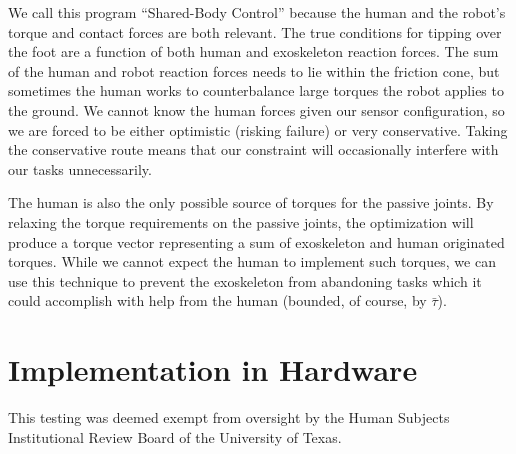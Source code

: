 

We call this program ``Shared-Body Control'' because the human and the robot's torque and contact forces are both relevant. The true conditions for tipping over the foot are a function of both human and exoskeleton reaction forces. The sum of the human and robot reaction forces needs to lie within the friction cone, but sometimes the human works to counterbalance large torques the robot applies to the ground. We cannot know the human forces given our sensor configuration, so we are forced to be either optimistic (risking failure) or very conservative. Taking the conservative route means that our constraint will occasionally interfere with our tasks unnecessarily. 

The human is also the only possible source of torques for the passive joints. By relaxing the torque requirements on the passive joints, the optimization will produce a torque vector representing a sum of exoskeleton and human originated torques. While we cannot expect the human to implement such torques, we can use this technique to prevent the exoskeleton from abandoning tasks which it could accomplish with help from the human (bounded, of course, by $\bar \tau$).


\section{Implementation in Hardware}\label{sec:exp}
 This testing was deemed exempt from oversight by the Human Subjects Institutional Review Board of the University of Texas.

